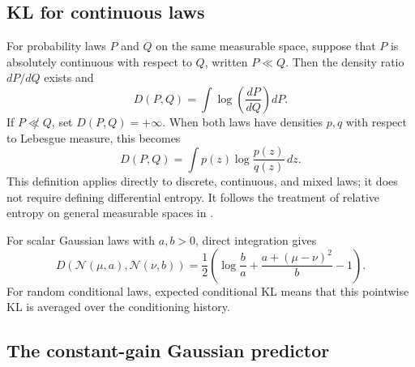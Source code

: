 \documentclass[11pt,twoside]{article}
\newcommand{\KL}{D}
\theoremstyle{definition}
\theoremstyle{remark}
\begin{document}
\subsection{KL for continuous laws}
\label{sec:continuous-kl}

For probability laws \(P\) and \(Q\) on the same measurable space, suppose
that \(P\) is absolutely continuous with respect to \(Q\), written
\(P\ll Q\). Then the density ratio \(dP/dQ\) exists and
\[
 \KL(P,Q)=\int \log\!\left(\frac{dP}{dQ}\right)dP.
\]
If \(P\not\ll Q\), set \(\KL(P,Q)=+\infty\). When both laws have densities
\(p,q\) with respect to Lebesgue measure, this becomes
\[
 \KL(P,Q)=\int p(z)\log\frac{p(z)}{q(z)}\,dz.
\]
This definition applies directly to discrete, continuous, and mixed laws; it
does not require defining differential entropy. It follows the treatment of
relative entropy on general measurable spaces in \citet[Chapter~14]{lattimore2020}.

For scalar Gaussian laws with \(a,b>0\), direct integration gives
\begin{equation}
 \KL\!\left(\mathcal N(\mu,a),\mathcal N(\nu,b)\right)
 =\frac12\left(
   \log\frac ba+\frac{a+(\mu-\nu)^2}{b}-1
 \right).
 \label{eq:gaussian-kl-scalar}
\end{equation}
For random conditional laws, expected conditional KL means that this
pointwise KL is averaged over the conditioning history.

\subsection{The constant-gain Gaussian predictor}
\label{app:kalman}
\end{document}
